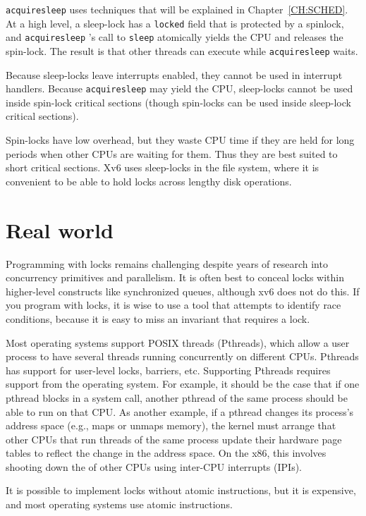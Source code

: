 \lstinline{acquiresleep}
uses techniques that will be explained in
Chapter~\ref{CH:SCHED}.
At a high level, a sleep-lock has a
\lstinline{locked}
field that is protected by a spinlock, and 
\lstinline{acquiresleep} 's
call to
\lstinline{sleep}
atomically yields the CPU and releases the spin-lock.
The result is that other threads can execute while
\lstinline{acquiresleep}
waits.

Because sleep-locks leave interrupts enabled, they cannot be
used in interrupt handlers.
Because
\lstinline{acquiresleep}
may yield the CPU,
sleep-locks cannot be used inside spin-lock critical
sections (though spin-locks can be used inside sleep-lock
critical sections).

Spin-locks have low overhead, but they waste CPU time if they
are held for long periods when other CPUs are waiting
for them.
Thus they are best suited to short critical sections.
Xv6 uses sleep-locks in the file system,
where it is convenient to
be able to hold locks across lengthy disk operations.
\section{Real world}
Programming with locks remains challenging despite years of research
into concurrency primitives and parallelism.
It is often best to conceal locks within 
higher-level constructs like synchronized queues, although xv6 does not
do this.  If you program with locks, it is wise to use a tool that attempts to
identify race conditions, because it is easy to miss an invariant that requires
a lock.

Most operating systems support POSIX threads (Pthreads), which allow a user
process to have several threads running concurrently on different CPUs.
Pthreads has support for user-level locks, barriers, etc.  Supporting Pthreads requires
support from the operating system. For example, it should be the case that if
one pthread blocks in a system call, another pthread of the same process should
be able to run on that CPU.  As another example, if a pthread changes its
process's address space (e.g., maps or unmaps memory), the kernel must arrange that
other CPUs that run threads of the same process update their hardware page
tables to reflect the change in the address space.  On the x86, this involves
shooting down the
of other CPUs using inter-CPU interrupts (IPIs).

It is possible to implement locks without atomic instructions, but it is
expensive, and most operating systems use atomic instructions.

